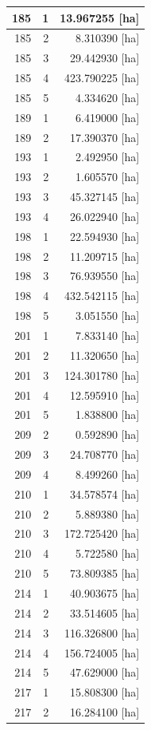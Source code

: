 \documentclass[11pt,]{book}
\begin{document}
\begin{table}
\begin{tabular}[t]{r|r|r}
\hline
185 & 1 & 13.967255 [ha]\\
\hline
185 & 2 & 8.310390 [ha]\\
\hline
185 & 3 & 29.442930 [ha]\\
\hline
185 & 4 & 423.790225 [ha]\\
\hline
185 & 5 & 4.334620 [ha]\\
\hline
189 & 1 & 6.419000 [ha]\\
\hline
189 & 2 & 17.390370 [ha]\\
\hline
193 & 1 & 2.492950 [ha]\\
\hline
193 & 2 & 1.605570 [ha]\\
\hline
193 & 3 & 45.327145 [ha]\\
\hline
193 & 4 & 26.022940 [ha]\\
\hline
198 & 1 & 22.594930 [ha]\\
\hline
198 & 2 & 11.209715 [ha]\\
\hline
198 & 3 & 76.939550 [ha]\\
\hline
198 & 4 & 432.542115 [ha]\\
\hline
198 & 5 & 3.051550 [ha]\\
\hline
201 & 1 & 7.833140 [ha]\\
\hline
201 & 2 & 11.320650 [ha]\\
\hline
201 & 3 & 124.301780 [ha]\\
\hline
201 & 4 & 12.595910 [ha]\\
\hline
201 & 5 & 1.838800 [ha]\\
\hline
209 & 2 & 0.592890 [ha]\\
\hline
209 & 3 & 24.708770 [ha]\\
\hline
209 & 4 & 8.499260 [ha]\\
\hline
210 & 1 & 34.578574 [ha]\\
\hline
210 & 2 & 5.889380 [ha]\\
\hline
210 & 3 & 172.725420 [ha]\\
\hline
210 & 4 & 5.722580 [ha]\\
\hline
210 & 5 & 73.809385 [ha]\\
\hline
214 & 1 & 40.903675 [ha]\\
\hline
214 & 2 & 33.514605 [ha]\\
\hline
214 & 3 & 116.326800 [ha]\\
\hline
214 & 4 & 156.724005 [ha]\\
\hline
214 & 5 & 47.629000 [ha]\\
\hline
217 & 1 & 15.808300 [ha]\\
\hline
217 & 2 & 16.284100 [ha]\\

\end{tabular}
\end{table}
\end{document}
